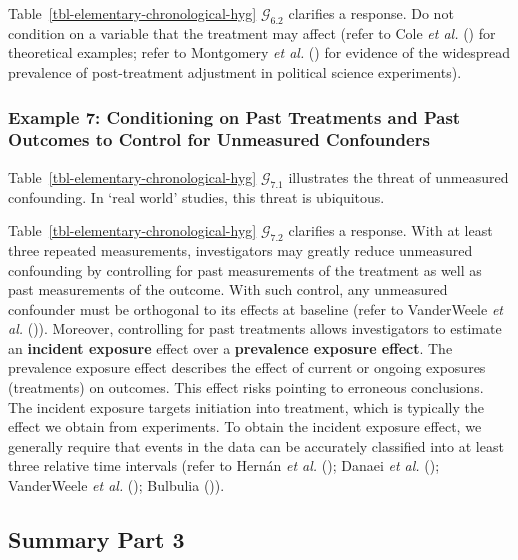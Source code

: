 \documentclass[
  single column]{article}
\begin{document}
Table~\ref{tbl-elementary-chronological-hyg} \(\mathcal{G}_{6.2}\)
clarifies a response. Do not condition on a variable that the treatment
may affect (refer to Cole \emph{et al.} ()
for theoretical examples; refer to Montgomery \emph{et al.}
() for evidence of the widespread
prevalence of post-treatment adjustment in political science
experiments).

\subsubsection{Example 7: Conditioning on Past Treatments and Past
Outcomes to Control for Unmeasured
Confounders}\label{example-7-conditioning-on-past-treatments-and-past-outcomes-to-control-for-unmeasured-confounders}

Table~\ref{tbl-elementary-chronological-hyg} \(\mathcal{G}_{7.1}\)
illustrates the threat of unmeasured confounding. In `real world'
studies, this threat is ubiquitous.

Table~\ref{tbl-elementary-chronological-hyg} \(\mathcal{G}_{7.2}\)
clarifies a response. With at least three repeated measurements,
investigators may greatly reduce unmeasured confounding by controlling
for past measurements of the treatment as well as past measurements of
the outcome. With such control, any unmeasured confounder must be
orthogonal to its effects at baseline (refer to VanderWeele \emph{et
al.} ()). Moreover, controlling for
past treatments allows investigators to estimate an \textbf{incident
exposure} effect over a \textbf{prevalence exposure effect}. The
prevalence exposure effect describes the effect of current or ongoing
exposures (treatments) on outcomes. This effect risks pointing to
erroneous conclusions. The incident exposure targets initiation into
treatment, which is typically the effect we obtain from experiments. To
obtain the incident exposure effect, we generally require that events in
the data can be accurately classified into at least three relative time
intervals (refer to Hernán \emph{et al.}
(); Danaei \emph{et al.}
(); VanderWeele \emph{et al.}
(); Bulbulia
()).

\subsection{Summary Part 3}\label{summary-part-3}
\end{document}
